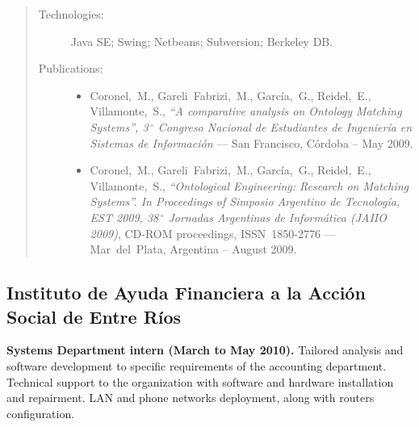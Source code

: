 \begin{quote}
\begin{description}
    \item[Technologies:] Java SE; Swing; Netbeans; Subversion; Berkeley DB.
    \item[Publications:] \hfill
    \begin{itemize}
		\item Coronel,~M., Gareli~Fabrizi,~M., García,~G., Reidel,~E., Villamonte,~S., \textit{``A comparative analysis on Ontology Matching Systems'', 3$\,^\circ$ Congreso Nacional de Estudiantes de Ingeniería en Sistemas de Información} --- San Francisco, Córdoba -- May 2009.
		\item Coronel,~M., Gareli~Fabrizi,~M., García,~G., Reidel,~E., Villamonte,~S., \textit{``Ontological Engineering: Research on Matching Systems''. In Proceedings of Simposio Argentino de Tecnología, EST 2009, 38$\,^\circ$ Jornadas Argentinas de Informática (JAIIO 2009)}, CD-ROM proceedings, ISSN~1850-2776 --- Mar~del~Plata, Argentina -- August 2009.
	\end{itemize}
\end{description}
\end{quote}

\subsection*{Instituto de Ayuda Financiera a la Acción Social de Entre Ríos}

\textbf{Systems Department intern (March to May 2010).} Tailored analysis and software development to specific requirements of the accounting department. Technical support to the organization with software and hardware installation and repairment. LAN and phone networks deployment, along with routers configuration.

